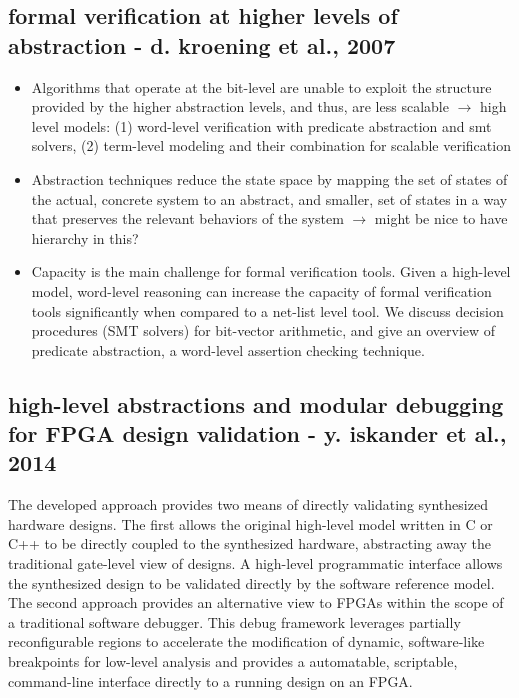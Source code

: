 \documentclass[]{article}
\begin{document}
\subsection{formal verification at higher levels of abstraction - d. kroening et al., 2007}

\begin{itemize}
    \item Algorithms that operate at the bit-level are unable to
    exploit the structure provided by the higher abstraction levels,
    and thus, are less scalable $\rightarrow$ high level models: (1) word-level verification with predicate abstraction and smt solvers, (2) term-level modeling and their combination for scalable verification 
    \item Abstraction techniques reduce
    the state space by mapping the set of states of the actual,
    concrete system to an abstract, and smaller, set of states in a
    way that preserves the relevant behaviors of the system $\rightarrow$ might be nice to have hierarchy in this?
    \item Capacity is the main challenge for formal verification
    tools. Given a high-level model, word-level reasoning can
    increase the capacity of formal verification tools significantly
    when compared to a net-list level tool. We discuss decision
    procedures (SMT solvers) for bit-vector arithmetic, and give
    an overview of predicate abstraction, a word-level assertion
    checking technique.
\end{itemize}

\subsection{high-level abstractions and modular debugging for FPGA design validation - y. iskander et al., 2014}
The developed approach provides two means of directly validating synthesized hardware designs.
The first allows the original high-level model written in C or C++ to be directly coupled to the synthesized
hardware, abstracting away the traditional gate-level view of designs. A high-level programmatic interface
allows the synthesized design to be validated directly by the software reference model. The second approach
provides an alternative view to FPGAs within the scope of a traditional software debugger. This debug
framework leverages partially reconfigurable regions to accelerate the modification of dynamic, software-like
breakpoints for low-level analysis and provides a automatable, scriptable, command-line interface directly
to a running design on an FPGA.
\end{document}

